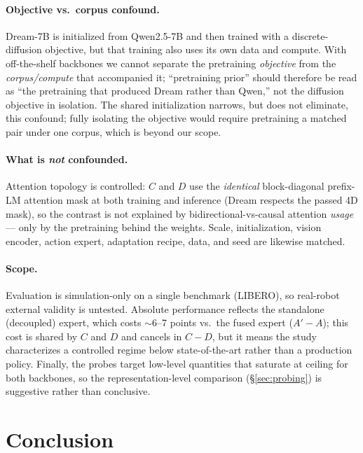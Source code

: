 \documentclass[conference]{IEEEtran}
\begin{document}
\paragraph{Objective vs.\ corpus confound.} Dream-7B is initialized from
Qwen2.5-7B and then trained with a discrete-diffusion objective, but that training
also uses its own data and compute. With off-the-shelf backbones we cannot
separate the pretraining \emph{objective} from the \emph{corpus/compute} that
accompanied it; ``pretraining prior'' should therefore be read as ``the
pretraining that produced Dream rather than Qwen,'' not the diffusion objective in
isolation. The shared initialization narrows, but does not eliminate, this
confound; fully isolating the objective would require pretraining a matched pair
under one corpus, which is beyond our scope.

\paragraph{What is \emph{not} confounded.} Attention topology is controlled: $C$
and $D$ use the \emph{identical} block-diagonal prefix-LM attention mask at both
training and inference (Dream respects the passed 4D mask), so the contrast is not
explained by bidirectional-vs-causal attention \emph{usage} --- only by the
pretraining behind the weights. Scale, initialization, vision encoder, action
expert, adaptation recipe, data, and seed are likewise matched.

\paragraph{Scope.} Evaluation is simulation-only on a single benchmark (LIBERO),
so real-robot external validity is untested. Absolute performance reflects the
standalone (decoupled) expert, which costs $\sim$6--7 points vs.\ the fused expert
($A'-A$); this cost is shared by $C$ and $D$ and cancels in $C-D$, but it means the
study characterizes a controlled regime below state-of-the-art rather than a
production policy. Finally, the probes target low-level quantities that saturate at
ceiling for both backbones, so the representation-level comparison
(\S\ref{sec:probing}) is suggestive rather than conclusive.

\section{Conclusion}
\end{document}

